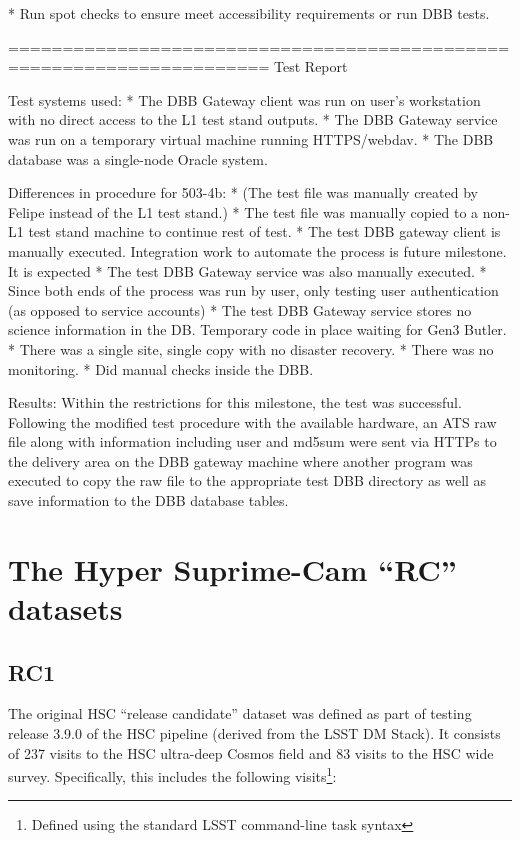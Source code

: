 \documentclass[DM,obsolete,STS,toc]{lsstdoc}
\begin{document}
* Run spot checks to ensure meet accessibility requirements or
 run DBB tests.


======================================================================
Test Report

Test systems used:
* The DBB Gateway client was run on user's workstation with no
direct access to the L1 test stand outputs.
* The DBB Gateway service was run on a temporary virtual machine
running HTTPS/webdav.
* The DBB database was a single-node Oracle system.

Differences in procedure for 503-4b:
* (The test file was manually created by Felipe instead of the L1
test stand.)
* The test file was manually copied to a non-L1 test stand machine
to continue rest of test.
* The test DBB gateway client is manually executed.  Integration
work to automate the process is future milestone.  It is expected
* The test DBB Gateway service was also manually executed.
* Since both ends of the process was run by user, only testing user
authentication (as opposed to service accounts)
* The test DBB Gateway service stores no science information in the
DB.  Temporary code in place waiting for Gen3 Butler.
* There was a single site, single copy with no disaster recovery.
* There was no monitoring.
* Did manual checks inside the DBB.

Results:
Within the restrictions for this milestone, the test was successful.
Following the modified test procedure with the available hardware,
an ATS raw file along with information including user and md5sum were
sent via HTTPs to the delivery area on the DBB gateway machine where
another program was executed to copy the raw file to the appropriate
test DBB directory as well as save information to the DBB database
tables.

\appendix

\section{The Hyper Suprime-Cam ``RC'' datasets}

\subsection{RC1}

The original HSC ``release candidate'' dataset was defined as part of testing
release 3.9.0 of the HSC pipeline (derived from the LSST DM Stack). It
consists of 237 visits to the HSC ultra-deep Cosmos field and 83 visits to the
HSC wide survey. Specifically, this includes the following
visits\footnote{Defined using the standard LSST command-line task syntax}:
\end{document}
